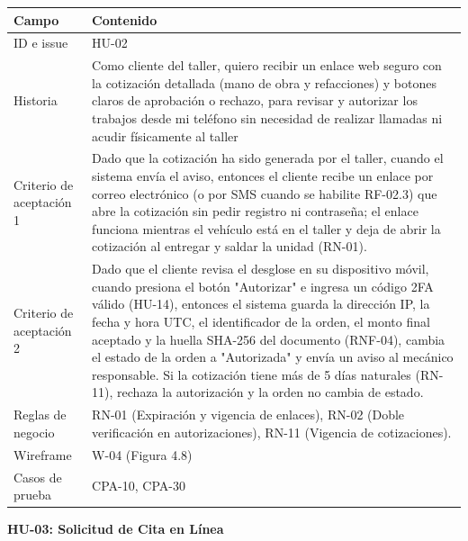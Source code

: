 {\def\LTcaptype{none} %
\begin{longtable}[]{@{}
  >{\raggedright\arraybackslash}p{}
  >{\raggedright\arraybackslash}p{}@{}}
\toprule\noalign{}
\begin{minipage}[b]{\linewidth}\raggedright
\textbf{Campo}
\end{minipage} & \begin{minipage}[b]{\linewidth}\raggedright
\textbf{Contenido}
\end{minipage} \\
\midrule\noalign{}
\endhead
\bottomrule\noalign{}
\endlastfoot
ID e issue & HU-02 \\
Historia & Como cliente del taller, quiero recibir un enlace web seguro
con la cotización detallada (mano de obra y refacciones) y botones
claros de aprobación o rechazo, para revisar y autorizar los trabajos
desde mi teléfono sin necesidad de realizar llamadas ni acudir
físicamente al taller \\
Criterio de aceptación 1 & Dado que la cotización ha sido generada por
el taller, cuando el sistema envía el aviso, entonces el cliente recibe
un enlace por correo electrónico (o por SMS cuando se habilite RF-02.3)
que abre la cotización sin pedir registro ni contraseña; el enlace
funciona mientras el vehículo está en el taller y deja de abrir la
cotización al entregar y saldar la unidad (RN-01). \\
Criterio de aceptación 2 & Dado que el cliente revisa el desglose en su
dispositivo móvil, cuando presiona el botón "Autorizar" e ingresa un
código 2FA válido (HU-14), entonces el sistema guarda la dirección
IP, la fecha y hora UTC, el identificador de la orden, el monto final
aceptado y la huella SHA-256 del documento (RNF-04), cambia el estado
de la orden a "Autorizada" y envía un aviso al mecánico responsable.
Si la cotización tiene más de 5 días naturales (RN-11), rechaza la
autorización y la orden no cambia de estado. \\
Reglas de negocio & RN-01 (Expiración y vigencia de enlaces), RN-02
(Doble verificación en autorizaciones), RN-11 (Vigencia de
cotizaciones). \\
Wireframe & W-04 (Figura 4.8) \\
Casos de prueba & CPA-10, CPA-30 \\
\end{longtable}
}

\textbf{HU-03: Solicitud de Cita en Línea}

